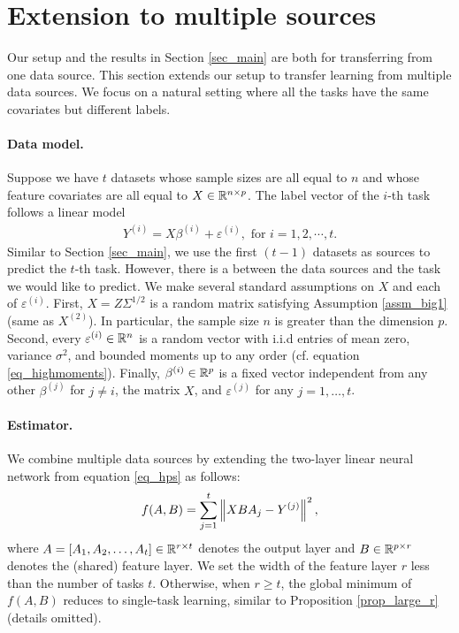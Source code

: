 \section{Extension to multiple sources}\label{sec_same}

Our setup and the results in Section \ref{sec_main} are both for transferring from one data source.
This section extends our setup to transfer learning from multiple data sources.
We focus on a natural setting where all the tasks have the same covariates but different labels.

\paragraph{Data model.} Suppose we have $t$ datasets whose sample sizes are all equal to $n$ and whose feature covariates are all equal to $X \in \mathbb{R}^{n \times p}$. The label vector of the $i$-th task follows a linear model
\begin{align}\label{eq_mtl_data}
    Y^{(i)} = X \beta^{(i)} + \varepsilon^{(i)}, \text{ for } i=1, 2,\cdots, t.
\end{align}
Similar to Section \ref{sec_main}, we use the first $(t-1)$ datasets as sources to predict the $t$-th task.
However, there is a  between the data sources and the task we would like to predict.
We make several standard assumptions on $X$ and each of $\varepsilon^{(i)}$.
First, $X = Z\Sigma^{1/2}$ is a random matrix satisfying Assumption \ref{assm_big1} (same as $X^{(2)}$).
In particular, the sample size $n$ is greater than the dimension $p$.
Second, every $\varepsilon^{(i)} \in \mathbb{R}^{n}$ is a random vector with i.i.d entries of mean zero, variance $\sigma^2$, and bounded moments up to any order (cf. equation \eqref{eq_highmoments}).
Finally, $\beta^{(i)} \in \mathbb{R}^{p}$ is a fixed vector independent from any other $\beta^{(j)}$ for $j \neq i$, the matrix $X$, and $\varepsilon^{(j)}$ for any $j=1,\dots,t$.

\paragraph{Estimator.} We combine multiple data sources by extending the two-layer linear neural network from equation \eqref{eq_hps} as follows:
\begin{align}
	f(A, B) = \sum_{j=1}^t \bignorm{X B A_j - Y^{(j)}}^2, \label{eq_mtl_same_cov}
\end{align}
where $A = [A_1, A_2, \dots, A_t] \in \mathbb{R}^{r \times t}$ denotes the output layer and $B \in \mathbb{R}^{p \times r}$ denotes the (shared) feature layer.
We set the width of the feature layer $r$ less than the number of tasks $t$.
Otherwise, when $r \ge t$, the global minimum of $f(A, B)$ reduces to single-task learning, similar to Proposition \ref{prop_large_r} (details omitted).

